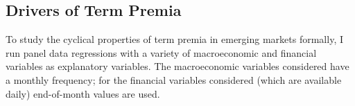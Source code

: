 {%
%
%

\subsection{Drivers of Term Premia}
To study the cyclical properties of term premia in emerging markets formally, I run  panel data regressions with a variety of macroeconomic and financial variables as explanatory variables. The macroeconomic variables considered have a monthly frequency; for the financial variables considered (which are available daily) end-of-month values are used.

}
